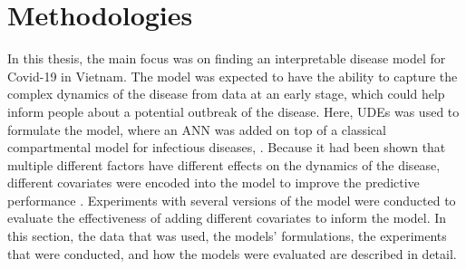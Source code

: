 \chapter{Methodologies}
\label{chap:methodologies}

In this thesis, the main focus was on finding an interpretable disease model for Covid-19 in Vietnam.
The model was expected to have the ability to capture the complex dynamics of the disease from data at an early stage, which could help inform people about a potential outbreak of the disease.
Here, \glspl{UDE} was used to formulate the model, where an \gls{ANN} was added on top of a classical compartmental model for infectious diseases, .
Because it had been shown that multiple different factors have different effects on the dynamics of the disease, different covariates were encoded into the model to improve the predictive performance \cite{ihmecovid-19forecastingteamModelingCOVID19Scenarios2021,arikInterpretableSequenceLearning}.
Experiments with several versions of the model were conducted to evaluate the effectiveness of adding different covariates to inform the model.
In this section, the data that was used, the models' formulations, the experiments that were conducted, and how the models were evaluated are described in detail.













